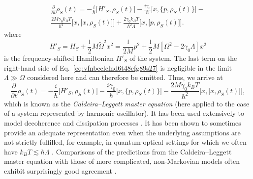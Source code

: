 \documentclass[3p,sort&compress,12pt]{elsarticle}
\newcommand{\I}{\ensuremath{i}}
\newcommand{\op}[1]{#1}
\begin{document}
%
\begin{multline}
\label{eq:vfnbcclclnd6t48efg89s27}
  \frac{\partial}{\partial t} \op{\rho}_S(t) 
  = -\frac{\I}{\hbar} \bigl[ \op{H}'_S, \op{\rho}_S(t) \bigr]
- \frac{\I \gamma_0}{\hbar} \bigl[ x, \bigl\{ p,
      \op{\rho}_S(t) \bigr\} \bigr] 
 -  \\
 \frac{2 M\gamma_0 k_B T}{\hbar^2} \bigl[ x, \bigl[ x, \op{\rho}_S(t) \bigr]\bigr]  + \frac{2\gamma_0k_B T}{\hbar^2\Lambda} \bigl[ x, \bigl[ p, \op{\rho}_S(t) \bigr]\bigr].
\end{multline}
%
where 
%
\begin{equation}
  \op{H}'_S = \op{H}_S + \frac{1}{2}M
  \widetilde{\Omega}^2 x^2 = \frac{1}{2M}p^2 +
  \frac{1}{2}M\left[ \Omega^2 - 2\gamma_0 \Lambda \right]x^2
\end{equation}
%
is the frequency-shifted Hamiltonian $\op{H}'_S$ of the system. The last term on the right-hand side of Eq.~\eqref{eq:vfnbcclclnd6t48efg89s27} is negligible in the limit $\Lambda \gg \Omega$ considered here and can therefore be omitted. Thus, we arrive at 
%
\begin{equation}
\label{eq:vfnbcclclnd9s27}
  \frac{\partial}{\partial t} \op{\rho}_S(t) 
  = -\frac{\I}{\hbar} \bigl[ \op{H}'_S, \op{\rho}_S(t) \bigr]
  - \frac{\I \gamma_0}{\hbar} \bigl[ x, \bigl\{ p,
      \op{\rho}_S(t) \bigr\} \bigr] 
 - \frac{2 M\gamma_0 k_B T}{\hbar^2} \bigl[ x, \bigl[ x, \op{\rho}_S(t) \bigr]\bigr],
\end{equation}
%
which is known as the \emph{Caldeira--Leggett master equation} \cite{Caldeira:1983:on} (here applied to the case of a system represented by harmonic oscillator). It has been used extensively to model decoherence and dissipation processes 
\cite{Gallis:1990:un,Gallis:1992:im,Anglin:1997:za}. It has been shown to sometimes provide an adequate representation even when the underlying assumptions are not strictly fulfilled, for example, in quantum-optical settings for which we often have $k_B T \lesssim \hbar\Lambda$ \cite{Walls:1985:lm}. Comparisons of the predictions from the Caldeira--Leggett master equation with those of more complicated, non-Markovian models often exhibit surprisingly good agreement \cite{Paz:1993:ta}.
\end{document}
